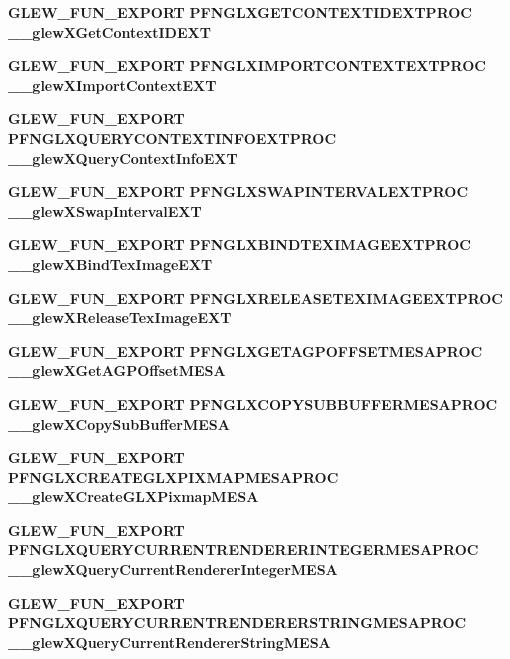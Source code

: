 \begin{DoxyCompactItemize}
\item 
{\bf G\+L\+E\+W\+\_\+\+F\+U\+N\+\_\+\+E\+X\+P\+O\+RT} {\bf P\+F\+N\+G\+L\+X\+G\+E\+T\+C\+O\+N\+T\+E\+X\+T\+I\+D\+E\+X\+T\+P\+R\+OC} {\bf \+\_\+\+\_\+glew\+X\+Get\+Context\+I\+D\+E\+XT}
\item 
{\bf G\+L\+E\+W\+\_\+\+F\+U\+N\+\_\+\+E\+X\+P\+O\+RT} {\bf P\+F\+N\+G\+L\+X\+I\+M\+P\+O\+R\+T\+C\+O\+N\+T\+E\+X\+T\+E\+X\+T\+P\+R\+OC} {\bf \+\_\+\+\_\+glew\+X\+Import\+Context\+E\+XT}
\item 
{\bf G\+L\+E\+W\+\_\+\+F\+U\+N\+\_\+\+E\+X\+P\+O\+RT} {\bf P\+F\+N\+G\+L\+X\+Q\+U\+E\+R\+Y\+C\+O\+N\+T\+E\+X\+T\+I\+N\+F\+O\+E\+X\+T\+P\+R\+OC} {\bf \+\_\+\+\_\+glew\+X\+Query\+Context\+Info\+E\+XT}
\item 
{\bf G\+L\+E\+W\+\_\+\+F\+U\+N\+\_\+\+E\+X\+P\+O\+RT} {\bf P\+F\+N\+G\+L\+X\+S\+W\+A\+P\+I\+N\+T\+E\+R\+V\+A\+L\+E\+X\+T\+P\+R\+OC} {\bf \+\_\+\+\_\+glew\+X\+Swap\+Interval\+E\+XT}
\item 
{\bf G\+L\+E\+W\+\_\+\+F\+U\+N\+\_\+\+E\+X\+P\+O\+RT} {\bf P\+F\+N\+G\+L\+X\+B\+I\+N\+D\+T\+E\+X\+I\+M\+A\+G\+E\+E\+X\+T\+P\+R\+OC} {\bf \+\_\+\+\_\+glew\+X\+Bind\+Tex\+Image\+E\+XT}
\item 
{\bf G\+L\+E\+W\+\_\+\+F\+U\+N\+\_\+\+E\+X\+P\+O\+RT} {\bf P\+F\+N\+G\+L\+X\+R\+E\+L\+E\+A\+S\+E\+T\+E\+X\+I\+M\+A\+G\+E\+E\+X\+T\+P\+R\+OC} {\bf \+\_\+\+\_\+glew\+X\+Release\+Tex\+Image\+E\+XT}
\item 
{\bf G\+L\+E\+W\+\_\+\+F\+U\+N\+\_\+\+E\+X\+P\+O\+RT} {\bf P\+F\+N\+G\+L\+X\+G\+E\+T\+A\+G\+P\+O\+F\+F\+S\+E\+T\+M\+E\+S\+A\+P\+R\+OC} {\bf \+\_\+\+\_\+glew\+X\+Get\+A\+G\+P\+Offset\+M\+E\+SA}
\item 
{\bf G\+L\+E\+W\+\_\+\+F\+U\+N\+\_\+\+E\+X\+P\+O\+RT} {\bf P\+F\+N\+G\+L\+X\+C\+O\+P\+Y\+S\+U\+B\+B\+U\+F\+F\+E\+R\+M\+E\+S\+A\+P\+R\+OC} {\bf \+\_\+\+\_\+glew\+X\+Copy\+Sub\+Buffer\+M\+E\+SA}
\item 
{\bf G\+L\+E\+W\+\_\+\+F\+U\+N\+\_\+\+E\+X\+P\+O\+RT} {\bf P\+F\+N\+G\+L\+X\+C\+R\+E\+A\+T\+E\+G\+L\+X\+P\+I\+X\+M\+A\+P\+M\+E\+S\+A\+P\+R\+OC} {\bf \+\_\+\+\_\+glew\+X\+Create\+G\+L\+X\+Pixmap\+M\+E\+SA}
\item 
{\bf G\+L\+E\+W\+\_\+\+F\+U\+N\+\_\+\+E\+X\+P\+O\+RT} {\bf P\+F\+N\+G\+L\+X\+Q\+U\+E\+R\+Y\+C\+U\+R\+R\+E\+N\+T\+R\+E\+N\+D\+E\+R\+E\+R\+I\+N\+T\+E\+G\+E\+R\+M\+E\+S\+A\+P\+R\+OC} {\bf \+\_\+\+\_\+glew\+X\+Query\+Current\+Renderer\+Integer\+M\+E\+SA}
\item 
{\bf G\+L\+E\+W\+\_\+\+F\+U\+N\+\_\+\+E\+X\+P\+O\+RT} {\bf P\+F\+N\+G\+L\+X\+Q\+U\+E\+R\+Y\+C\+U\+R\+R\+E\+N\+T\+R\+E\+N\+D\+E\+R\+E\+R\+S\+T\+R\+I\+N\+G\+M\+E\+S\+A\+P\+R\+OC} {\bf \+\_\+\+\_\+glew\+X\+Query\+Current\+Renderer\+String\+M\+E\+SA}

\end{DoxyCompactItemize}
